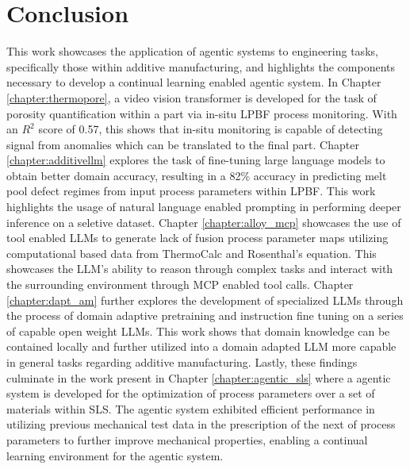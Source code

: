 \chapter{Conclusion}

This work showcases the application of agentic systems to engineering tasks,
specifically those within additive manufacturing, and highlights the components
necessary to develop a continual learning enabled agentic system. In Chapter
\ref{chapter:thermopore}, a video vision transformer is developed for the task
of porosity quantification within a part via in-situ LPBF process monitoring.
With an $R^2$ score of 0.57, this shows that in-situ monitoring is capable of
detecting signal from anomalies which can be translated to the final part.
Chapter \ref{chapter:additivellm} explores the task of fine-tuning large
language models to obtain better domain accuracy, resulting in a 82\% accuracy
in predicting melt pool defect regimes from input process parameters within LPBF.
This work highlights the usage of natural language enabled prompting in
performing deeper inference on a seletive dataset. Chapter
\ref{chapter:alloy_mcp} showcases the use of tool enabled LLMs to generate lack
of fusion process parameter maps utilizing computational based data from
ThermoCalc and Rosenthal's equation. This showcases the LLM's ability to reason
through complex tasks and interact with the surrounding environment through MCP
enabled tool calls. Chapter \ref{chapter:dapt_am} further explores the
development of specialized LLMs through the process of domain adaptive
pretraining and instruction fine tuning on a series of capable open weight LLMs.
This work shows that domain knowledge can be contained locally and further
utilized into a domain adapted LLM more capable in general tasks regarding
additive manufacturing. Lastly, these findings culminate in the work present in
Chapter \ref{chapter:agentic_sls} where a agentic system is developed for the
optimization of process parameters over a set of materials within SLS. The
agentic system exhibited efficient performance in utilizing previous mechanical
test data in the prescription of the next of process parameters to further
improve mechanical properties, enabling a continual learning environment for the
agentic system.
